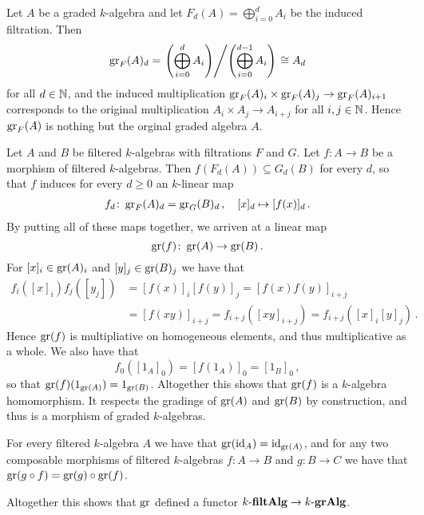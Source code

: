 \begin{example}
  \label{example: associated of graded}
  Let $A$ be a graded $k$-algebra and let $F_d(A) = \bigoplus_{i=0}^d A_i$ be the induced filtration.
  Then
  \[
          \operatorname{gr}_F(A)_d
    =     \left.
            \left( \bigoplus_{i=0}^d A_i \right)
          \middle/
            \left( \bigoplus_{i=0}^{d-1} A_i \right)
          \right.
    \cong A_d
  \]
  for all $d \in \mathbb{N}$, and the induced multiplication $\operatorname{gr}_F(A)_i \times \operatorname{gr}_F(A)_j \to \operatorname{gr}_F(A)_{i+1}$ corresponds to the original multiplication $A_i \times A_j \to A_{i+j}$ for all $i, j \in \mathbb{N}$.
  Hence $\operatorname{gr}_F(A)$ is nothing but the orginal graded algebra $A$.
\end{example}


\begin{remark}
  Let $A$ and $B$ be filtered $k$-algebras with filtrations $F$ and $G$.
  Let $f \colon A \to B$ be a morphism of filtered $k$-algebras.
  Then $f(F_d(A)) \subseteq G_d(B)$ for every $d$, so that $f$ induces for every $d \geq 0$ an $k$-linear map
  \begin{align*}
            f_d
    \colon  \operatorname{gr}_F(A)_d
    =       \operatorname{gr}_G(B)_d \,,
    \quad   [x]_d
    \mapsto [f(x)]_d \,.
  \end{align*}
  By putting all of these maps together, we arriven at a linear map
  \[
            \operatorname{gr}(f)
    \colon  \operatorname{gr}(A)
    \to     \operatorname{gr}(B) \,.
  \]
  For $[x]_i \in \operatorname{gr}(A)_i$ and $[y]_j \in \operatorname{gr}(B)_j$ we have that
  \begin{align*}
        f_i([x]_i) f_j([y_j])
    &=  [f(x)]_i [f(y)]_j
     =  [f(x) f(y)]_{i+j} \\
    &=  [f(xy)]_{i+j}
     =  f_{i+j}([xy]_{i+j})
     =  f_{i+j}([x]_i [y]_j) \,.
  \end{align*}
  Hence $\operatorname{gr}(f)$ is multipliative on homogeneous elements, and thus multiplicative as a whole.
  We also have that
  \[
      f_0([1_A]_0)
    = [f(1_A)]_0
    = [1_B]_0 \,,
  \]
  so that $\operatorname{gr}(f)(1_{\operatorname{gr}(A)}) = 1_{\operatorname{gr}(B)}$.
  Altogether this shows that $\operatorname{gr}(f)$ is a $k$-algebra homomorphism.
  It respects the gradings of $\operatorname{gr}(A)$ and $\operatorname{gr}(B)$ by construction, and thus is a morphism of graded $k$-algebras.
  
  For every filtered $k$-algebra $A$ we have that $\operatorname{gr}(\operatorname{id}_A) = \operatorname{id}_{\operatorname{gr}(A)}$, and for any two composable morphisms of filtered $k$-algebras $f \colon A \to B$ and $g \colon B \to C$ we have that $\operatorname{gr}(g \circ f) = \operatorname{gr}(g) \circ \operatorname{gr}(f)$.
  
  Altogether this shows that $\operatorname{gr}$ defined a functor $k\text{-}\mathbf{filtAlg} \to k\text{-}\mathbf{grAlg}$.
\end{remark}


